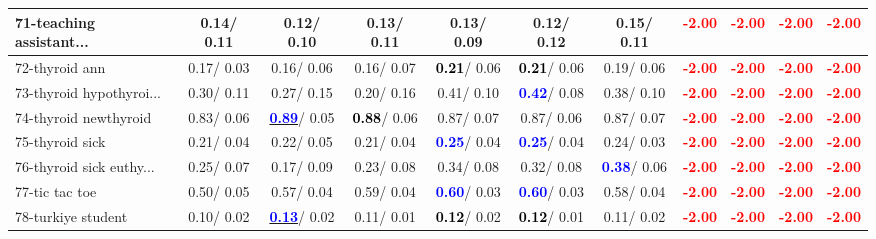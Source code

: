 \begin{table}[h]
\begin{center}
{\begin{tabular}{lc|c|c|c|c|c|c|c|c|c}
71-teaching assistant... &   0.14/  0.11 &   0.12/  0.10 &   0.13/  0.11 &   0.13/  0.09 &   0.12/  0.12 &   0.15/  0.11 & \textcolor{red}{\textbf{ -2.00}} & \textcolor{red}{\textbf{ -2.00}} & \textcolor{red}{\textbf{ -2.00}} & \textcolor{red}{\textbf{ -2.00}} \\ \hline
72-thyroid ann &   0.17/  0.03 &   0.16/  0.06 &   0.16/  0.07 & \textcolor{black}{\textbf{  0.21}}/  0.06 & \textcolor{black}{\textbf{  0.21}}/  0.06 &   0.19/  0.06 & \textcolor{red}{\textbf{ -2.00}} & \textcolor{red}{\textbf{ -2.00}} & \textcolor{red}{\textbf{ -2.00}} & \textcolor{red}{\textbf{ -2.00}} \\
73-thyroid hypothyroi... &   0.30/  0.11 &   0.27/  0.15 &   0.20/  0.16 &   0.41/  0.10 & \textcolor{blue}{\textbf{  0.42}}/  0.08 &   0.38/  0.10 & \textcolor{red}{\textbf{ -2.00}} & \textcolor{red}{\textbf{ -2.00}} & \textcolor{red}{\textbf{ -2.00}} & \textcolor{red}{\textbf{ -2.00}} \\
74-thyroid newthyroid &   0.83/  0.06 & \underline{\textcolor{blue}{\textbf{  0.89}}}/  0.05 & \textcolor{black}{\textbf{  0.88}}/  0.06 &   0.87/  0.07 &   0.87/  0.06 &   0.87/  0.07 & \textcolor{red}{\textbf{ -2.00}} & \textcolor{red}{\textbf{ -2.00}} & \textcolor{red}{\textbf{ -2.00}} & \textcolor{red}{\textbf{ -2.00}} \\
75-thyroid sick &   0.21/  0.04 &   0.22/  0.05 &   0.21/  0.04 & \textcolor{blue}{\textbf{  0.25}}/  0.04 & \textcolor{blue}{\textbf{  0.25}}/  0.04 &   0.24/  0.03 & \textcolor{red}{\textbf{ -2.00}} & \textcolor{red}{\textbf{ -2.00}} & \textcolor{red}{\textbf{ -2.00}} & \textcolor{red}{\textbf{ -2.00}} \\
76-thyroid sick euthy... &   0.25/  0.07 &   0.17/  0.09 &   0.23/  0.08 &   0.34/  0.08 &   0.32/  0.08 & \textcolor{blue}{\textbf{  0.38}}/  0.06 & \textcolor{red}{\textbf{ -2.00}} & \textcolor{red}{\textbf{ -2.00}} & \textcolor{red}{\textbf{ -2.00}} & \textcolor{red}{\textbf{ -2.00}} \\
77-tic tac toe &   0.50/  0.05 &   0.57/  0.04 &   0.59/  0.04 & \textcolor{blue}{\textbf{  0.60}}/  0.03 & \textcolor{blue}{\textbf{  0.60}}/  0.03 &   0.58/  0.04 & \textcolor{red}{\textbf{ -2.00}} & \textcolor{red}{\textbf{ -2.00}} & \textcolor{red}{\textbf{ -2.00}} & \textcolor{red}{\textbf{ -2.00}} \\
78-turkiye student &   0.10/  0.02 & \underline{\textcolor{blue}{\textbf{  0.13}}}/  0.02 &   0.11/  0.01 & \textcolor{black}{\textbf{  0.12}}/  0.02 & \textcolor{black}{\textbf{  0.12}}/  0.01 &   0.11/  0.02 & \textcolor{red}{\textbf{ -2.00}} & \textcolor{red}{\textbf{ -2.00}} & \textcolor{red}{\textbf{ -2.00}} & \textcolor{red}{\textbf{ -2.00}} \\ \hline

\end{tabular}}
\end{center}
\end{table}
